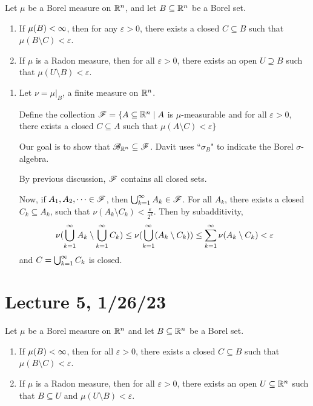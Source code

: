 \documentclass[x11names,reqno,14pt]{extarticle}
\newcommand{\seq}[2][\oo]{_{#2 = 1}^#1}
\newcommand{\bigcupk}[1][\oo]{\bigcup\seq[#1]{k}}
\newcommand{\bigcapk}[1][\oo]{\bigcup\seq[#1]{k}}
\begin{document}
\thm Let $\mu$ be a Borel measure on $\mathbb{R}^n$, and let $B \subseteq \mathbb{R}^n$ be a Borel set. 

\begin{enumerate}

\item If $\mu(B)<\infty$, then for any $\varepsilon>0$, there exists a closed $C \subseteq B$ such that $\mu(B\setminus C) < \varepsilon$. 

\item If $\mu$ is a Radon measure, then for all $\varepsilon>0$, there exists an open $U \supseteq B$ such that $\mu(U\setminus B) < \varepsilon$. 

\end{enumerate}

\proof

\begin{enumerate}

\item Let $\nu = \mu|_B$, a finite measure on $\mathbb{R}^n$. 

Define the collection $\mathscr{F} = \{A\subseteq\mathbb{R}^n\mid A$ is $\mu$-measurable and for all $\varepsilon > 0, $ there exists a closed $C \subseteq  A$ such that $\mu(A\setminus C) < \varepsilon \}$

Our goal is to show that $\mathscr{B}_{\mathbb{R}^n}\subseteq\mathscr{F}$. Davit uses ``$\sigma_B$" to indicate the Borel $\sigma$-algebra. 

By previous discussion, $\mathscr{F}$ contains all closed sets. 

Now, if $A_1, A_2, \dots \in \mathscr{F}$, then $\bigcapk A_k\in\ms{F}$. For all $A_k$, there exists a closed $C_k \subseteq A_k$, such that $\nu(A_k\setminus C_k) < \frac{\varepsilon}{2^k}$. Then by subadditivity, 
\[
\nu(\bigcapk A_k \setminus \bigcapk C_k) \leq \nu(\bigcupk(A_k \setminus C_k)) \leq \sum\seq{k}\nu(A_k\setminus C_k) < \varepsilon
\]
and $C = \bigcapk C_k$ is closed. 


\end{enumerate}

\section*{Lecture 5, 1/26/23}

\thm 

Let $\mu$ be a Borel measure on $\mathbb{R}^n$ and let $B \subseteq \mathbb{R}^n$ be a Borel set. 
\begin{enumerate}

\item If $\mu(B)<\infty$, then for all $\varepsilon>0$, there exists a closed $C \subseteq B$ such that $\mu(B\setminus C) < \varepsilon$. 

\item If $\mu$ is a Radon measure, then for all $\varepsilon>0$, there exists an open $U \subseteq \mathbb{R}^n$ such that $B \subseteq U$ and $\mu(U\setminus B)<\varepsilon$. 

\end{enumerate}
\end{document}
